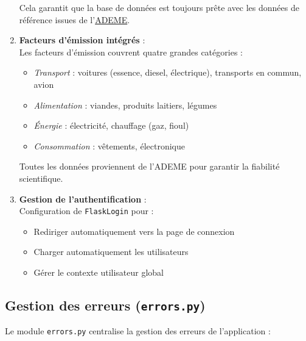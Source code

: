 \documentclass[a4paper,11pt]{article}
\begin{document}
\begin{enumerate}
                    \noindent Cela garantit que la base de données est toujours prête avec les données de référence issues de l'\href{https://www.ademe.fr/}{ADEME}.

                \item \textbf{Facteurs d'émission intégrés} :\\
                    \noindent Les facteurs d'émission couvrent quatre grandes catégories :
                    
                    \begin{itemize}
                        \item \textit{Transport} : voitures (essence, diesel, électrique), transports en commun, avion
                        \item \textit{Alimentation} : viandes, produits laitiers, légumes
                        \item \textit{Énergie} : électricité, chauffage (gaz, fioul)
                        \item \textit{Consommation} : vêtements, électronique
                    \end{itemize}

                    \noindent Toutes les données proviennent de l'ADEME pour garantir la fiabilité scientifique.

                \item \textbf{Gestion de l'authentification} :\\
                    \noindent Configuration de \texttt{Flask\-Login} pour :
                    \begin{itemize}
                        \item Rediriger automatiquement vers la page de connexion
                        \item Charger automatiquement les utilisateurs
                        \item Gérer le contexte utilisateur global
                    \end{itemize}
            \end{enumerate}

        \subsection{Gestion des erreurs (\texttt{errors.py})}
            \noindent Le module \texttt{errors.py} centralise la gestion des erreurs de l'application :

            
\end{document}
